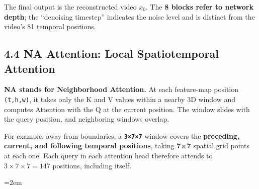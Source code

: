 \documentclass[
  11pt,
  a4paper,
]{article}
\newcommand{\NotesTableStyle}{\linespread{1}\fontsize{9.5pt}{13pt}\selectfont\setlength{\tabcolsep}{4pt}\renewcommand{\arraystretch}{1.1}\setlength{\extrarowheight}{5pt}\setlength{\LTpre}{5pt}\setlength{\LTpost}{6pt}\setlength{\parskip}{0pt}\emergencystretch=2em}
\begin{document}
\endgroup

The final output is the reconstructed video \(x_0\). The \textbf{8
blocks refer to network depth}; the ``denoising timestep'' indicates the
noise level and is distinct from the video's 81 temporal positions.


\subsection{4.4 NA Attention: Local Spatiotemporal
Attention}\label{ltx25-na}

\textbf{NA stands for Neighborhood Attention.} At each feature-map
position \texttt{(t,h,w)}, it takes only the K and V values within a
nearby 3D window and computes Attention with the Q at the current
position. The window slides with the query position, and neighboring
windows overlap.

For example, away from boundaries, a \textbf{\texttt{3×7×7}} window
covers the \textbf{preceding, current, and following temporal
positions}, taking \textbf{7×7} spatial grid points at each one. Each
query in each attention head therefore attends to
\textbf{\(3\times7\times7=147\)} positions, including itself.

\begingroup\NotesTableStyle\fontsize{10pt}{12pt}\selectfont\renewcommand{\arraystretch}{1.02}\setlength{\extrarowheight}{1pt}
\end{document}
